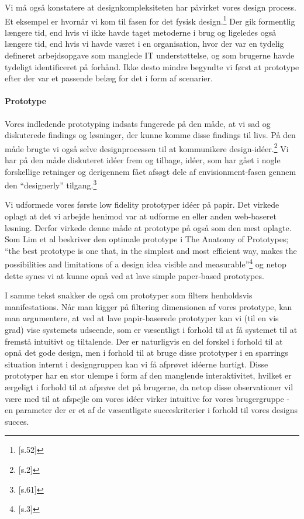Vi må også konstatere at designkompleksiteten har påvirket vores design process. Et eksempel er hvornår vi kom til fasen for det fysisk design.\footnote{\citep{Benyon}[s.52]} Der gik formentlig længere tid, end hvis vi ikke havde taget metoderne i brug og ligeledes også længere tid, end hvis vi havde været i en organisation, hvor der var en tydelig defineret arbejdsopgave som manglede IT understøttelse, og som brugerne havde tydeligt identificeret på forhånd. Ikke desto mindre begyndte vi først at prototype efter der var et passende belæg for det i form af scenarier.

\paragraph{Prototype}
Vores indledende prototyping indsats fungerede på den måde, at vi sad og diskuterede findings og løsninger, der kunne komme disse findings til livs. På den måde brugte vi også selve designprocessen til at kommunikere design-idéer.\footnote{\citep{Lim}[s.2]} Vi har på den måde diskuteret idéer frem og tilbage, idéer, som har gået i nogle forskellige retninger og derigennem fået afsøgt dele af envisionment-fasen gennem den “designerly” tilgang.\footnote{\citep{Stolterman}[s.61]}

Vi udformede vores første low fidelity prototyper idéer på papir. Det virkede oplagt at det vi arbejde henimod var at udforme en eller anden web-baseret løsning. Derfor virkede denne måde at prototype på også som den mest oplagte. Som Lim et al beskriver den optimale prototype i The Anatomy of Prototypes; “the best prototype is one that, in the simplest and most efficient way, makes the possibilities and limitations of a design idea visible and measurable”\footnote{\citep{Lim}[s.3]} og netop dette synes vi at kunne opnå ved at lave simple paper-based prototypes. 

I samme tekst snakker de også om prototyper som filters henholdsvis manifestations. Når man kigger på filtering dimensionen af vores prototype, kan man argumentere, at ved at lave papir-baserede prototyper kan vi (til en vis grad) vise systemets udseende, som er væsentligt i forhold til at få systemet til at fremstå intuitivt og tiltalende. Der er naturligvis en del forskel i forhold til at opnå det gode design, men i forhold til at bruge disse prototyper i en sparrings situation internt i designgruppen kan vi få  afprøvet idéerne hurtigt. Disse prototyper har en stor ulempe i form af den manglende interaktivitet, hvilket er ærgeligt i forhold til at afprøve det på brugerne, da netop disse observationer vil være med til at afspejle om vores idéer virker intuitive for vores brugergruppe - en parameter der er et af de væsentligste succeskriterier i forhold til vores designs succes.

